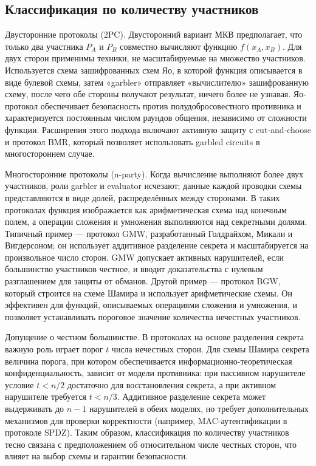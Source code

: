 \subsection{Классификация по количеству участников}

Двусторонние протоколы (2PC). Двусторонний вариант МКВ предполагает, что только два участника \(P_A\) и \(P_B\) совместно вычисляют функцию \(f(x_A,x_B)\).  Для двух сторон применимы техники, не масштабируемые на множество участников.  Используется схема зашифрованных схем Яо, в которой функция описывается в виде булевой схемы, затем «garbler» отправляет «вычислителю» зашифрованную схему, после чего обе стороны получают результат, ничего более не узнавая.  Яо-протокол обеспечивает безопасность против полудобросовестного противника и характеризуется постоянным числом раундов общения, независимо от сложности функции.  Расширения этого подхода включают активную защиту с cut-and-choose и протокол BMR, который позволяет использовать garbled circuits в многостороннем случае.

Многосторонние протоколы (n-party). Когда вычисление выполняют более двух участников, роли garbler и evaluator исчезают; данные каждой проводки схемы представляются в виде долей, распределённых между сторонами.  В таких протоколах функция изображается как арифметическая схема над конечным полем, а операции сложения и умножения выполняются над секретными долями.  Типичный пример --- протокол GMW, разработанный Голдрайхом, Микали и Вигдерсоном; он использует аддитивное разделение секрета и масштабируется на произвольное число сторон.  GMW допускает активных нарушителей, если большинство участников честное, и вводит доказательства с нулевым разглашением для защиты от обманов.  Другой пример --- протокол BGW, который строится на схеме Шамира и использует арифметические схемы.  Он эффективен для функций, описываемых операциями сложения и умножения, и позволяет устанавливать пороговое значение количества нечестных участников.

Допущение о честном большинстве. В протоколах на основе разделения секрета важную роль играет порог \(t\) числа нечестных сторон.  Для схемы Шамира секрета величина порога, при котором обеспечивается информационно-\allowbreak теоретическая конфиденциальность, зависит от модели противника: при пассивном нарушителе условие \(t< n/2\) достаточно для восстановления секрета, а при активном нарушителе требуется \(t< n/3\).  Аддитивное разделение секрета может выдерживать до \(n-1\) нарушителей в обеих моделях, но требует дополнительных механизмов для проверки корректности (например, MAC-аутентификации в протоколе SPDZ).  Таким образом, классификация по количеству участников тесно связана с предположением об относительном числе честных сторон, что влияет на выбор схемы и гарантии безопасности.

